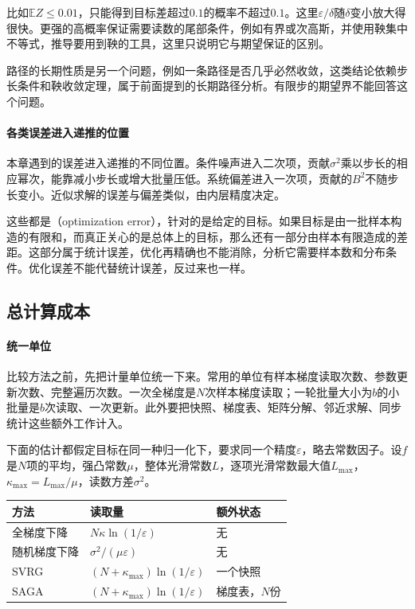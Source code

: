 比如$\mathbb{E}Z\leq0.01$，只能得到目标差超过$0.1$的概率不超过$0.1$。这里$\varepsilon/\delta$随$\delta$变小放大得很快。更强的高概率保证需要读数的尾部条件，例如有界或次高斯，并使用鞅集中不等式，推导要用到鞅的工具，这里只说明它与期望保证的区别。

路径的长期性质是另一个问题，例如一条路径是否几乎必然收敛，这类结论依赖步长条件和鞅收敛定理，属于前面提到的长期路径分析。有限步的期望界不能回答这个问题。

\paragraph{各类误差进入递推的位置}
本章遇到的误差进入递推的不同位置。条件噪声进入二次项，贡献$\sigma^2$乘以步长的相应幂次，能靠减小步长或增大批量压低。系统偏差进入一次项，贡献的$B^2$不随步长变小。近似求解的误差与偏差类似，由内层精度决定。

这些都是（optimization error），针对的是给定的目标。如果目标是由一批样本构造的有限和，而真正关心的是总体上的目标，那么还有一部分由样本有限造成的差距。这部分属于统计误差，优化再精确也不能消除，分析它需要样本数和分布条件。优化误差不能代替统计误差，反过来也一样。

\subsection{总计算成本}
\label{sec:sgdb-total-cost}

\paragraph{统一单位}
比较方法之前，先把计量单位统一下来。常用的单位有样本梯度读取次数、参数更新次数、完整遍历次数。一次全梯度是$N$次样本梯度读取；一轮批量大小为$b$的小批量是$b$次读取、一次更新。此外要把快照、梯度表、矩阵分解、邻近求解、同步统计这些额外工作计入。

下面的估计都假定目标在同一种归一化下，要求同一个精度$\varepsilon$，略去常数因子。设$f$是$N$项的平均，强凸常数$\mu$，整体光滑常数$L$，逐项光滑常数最大值$L_{\max}$，$\kappa_{\max}=L_{\max}/\mu$，读数方差$\sigma^2$。

\begin{BookInlineTable}
  \centering
  \caption{强凸有限和目标上达到目标差$\varepsilon$的样本梯度读取量，略去常数因子。}
  \label{tab:sgdb-cost-table}
  \begin{tabular}{lll}
    \toprule
    方法 & 读取量 & 额外状态\\
    \midrule
    全梯度下降 & $N\kappa\ln(1/\varepsilon)$ & 无\\
    随机梯度下降 & $\sigma^2/(\mu\varepsilon)$ & 无\\
    SVRG & $(N+\kappa_{\max})\ln(1/\varepsilon)$ & 一个快照\\
    SAGA & $(N+\kappa_{\max})\ln(1/\varepsilon)$ & 梯度表，$N$份\\
    \bottomrule
  \end{tabular}
\end{BookInlineTable}

